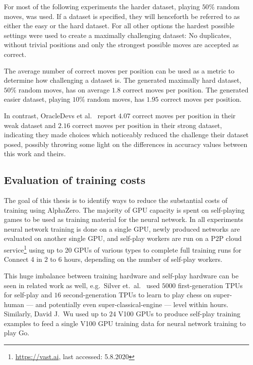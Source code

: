 \documentclass[12pt,onecolumn,oneside,titlepage]{article}
\begin{document}
For most of the following experiments the harder dataset, playing $50\%$ random moves, was used. If a dataset is specified, they will henceforth be referred to as either the easy or the hard dataset.
For all other options the hardest possible settings were used to create a maximally challenging dataset:
No duplicates, without trivial positions and only the strongest possible moves are accepted as correct.

The average number of correct moves per position can be used as a metric to determine how challenging a dataset is. The generated maximally hard dataset, $50\%$ random moves, has on average $1.8$ correct moves per position.
The generated easier dataset, playing $10\%$ random moves, has $1.95$ correct moves per position.

In contrast, OracleDevs et al.\ \cite{oracledevs} report $4.07$ correct moves per position in their weak dataset and $2.16$ correct moves per position in their strong dataset,
indicating they made choices which noticeably reduced the challenge their dataset posed, 
possibly throwing some light on the differences in accuracy values between this work and theirs.

\subsection{Evaluation of training costs}

The goal of this thesis is to identify ways to reduce the substantial costs of training using AlphaZero. 
The majority of GPU capacity is spent on self-playing games to be used as training material for the neural network.
In all experiments neural network training is done on a single GPU, newly produced networks are evaluated on another 
single GPU, and self-play workers are run on a P2P cloud service\footnote{\url{https://vast.ai}, last accessed: 5.8.2020} using up to 20 GPUs of various types to complete full training runs
for Connect 4 in $2$ to $6$ hours, depending on the number of self-play workers.

This huge imbalance between training hardware and self-play hardware can be seen in related work as well, e.g.\ Silver et.\ al.\ \cite{AlphaZero} 
used $5000$ first-generation TPUs for self-play and $16$ second-generation TPUs 
to learn to play chess on super-human --- and potentially even super-classical-engine --- level within hours.
Similarly, David J.\ Wu \cite{wu2019accelerating} used up to $24$ V100 GPUs to produce self-play training examples to feed a single V100 GPU training data for neural network training to play Go.
\end{document}
